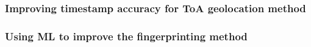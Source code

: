 \subsubsection{Improving timestamp accuracy for \acf{ToA} geolocation method}


\subsubsection{Using \acf{ML} to improve the fingerprinting method}